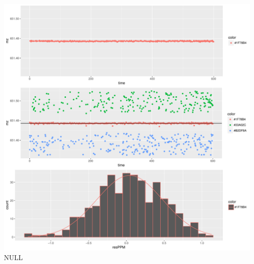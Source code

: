 \documentclass[]{article}
\begin{document}
\includegraphics{Supplementary_document_files/figure-latex/filter.lm.651-1.pdf}
NULL
\end{document}
